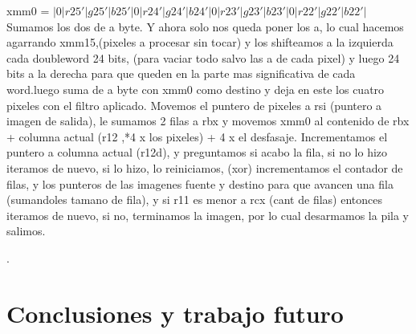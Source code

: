 \documentclass[a4paper]{article}
\begin{document}
 \hfill \break
 xmm0 = $|0|r25'|g25'|b25'|0|r24'|g24'|b24'|0|r23'|g23'|b23'|0|r22'|g22'|b22'| $
 \hfill \break
  Sumamos los dos de a byte. Y ahora solo nos queda poner los a, lo cual hacemos agarrando xmm15,(pixeles a procesar sin tocar) y los shifteamos a la izquierda cada doubleword 24 bits, (para vaciar todo salvo las a de cada pixel) y luego 24  bits a la derecha para que queden en la parte mas significativa de cada word.luego suma de a byte con xmm0 como destino y deja en este los cuatro pixeles con el filtro aplicado.
  \hfill \break
  Movemos el puntero de pixeles a rsi (puntero a imagen de salida), le sumamos 2 filas a rbx y movemos xmm0 al contenido de rbx + columna actual (r12 ,*4 x los pixeles) + 4 x el desfasaje. 
  \hfill \break
  Incrementamos el puntero a  columna actual (r12d), y preguntamos si acabo la fila, si no lo hizo iteramos de nuevo, si lo hizo, lo reiniciamos, (xor) incrementamos el contador de filas, y  los punteros de las imagenes fuente y destino para que avancen una fila (sumandoles tamano de fila), y si r11 es menor a rcx (cant de filas) entonces iteramos de nuevo, si no, terminamos la imagen, por lo cual desarmamos la pila y salimos. 
 \hfill \break
 
 







 
 

  
 

    
   
 
 
 
    	
	  
	
	 
	 
	
	
	   
		
	
	
	.
	
	
	
	
	 

	
	
	  



\section{Conclusiones y trabajo futuro}
\end{document}
